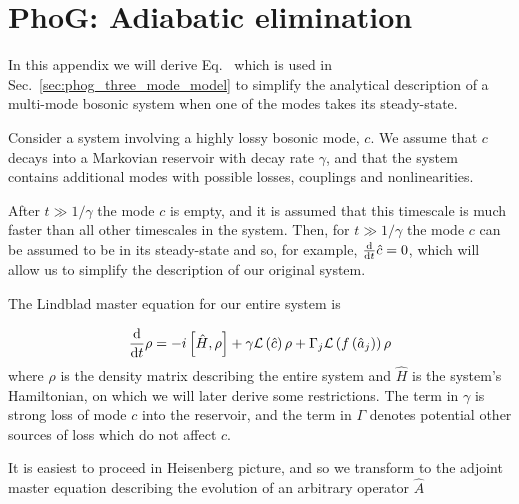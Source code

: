 %
%
%


\chapter{PhoG: Adiabatic elimination}\label{appendix:adiabatic_elimination}

In this appendix we will derive Eq.~ which is used in Sec.~\ref{sec:phog_three_mode_model} to simplify the analytical description of a multi-mode bosonic system when one of the modes takes its steady-state. 

Consider a system involving a highly lossy bosonic mode, $c$. We assume that $c$ decays into a Markovian reservoir with decay rate $\gamma$, and that the system contains additional modes with possible losses, couplings and nonlinearities. 

After $t \gg 1/\gamma$ the mode $c$ is empty, and it is assumed that this timescale is much faster than all other timescales in the system. Then, for $t \gg 1/\gamma$ the mode $c$ can be assumed to be in its steady-state and so, for example, $\frac{\mathrm{d}}{\mathrm{d}t} \hat{c} = 0$, which will allow us to simplify the description of our original system.

The Lindblad master equation for our entire system is

\begin{equation}
\frac{\mathrm{d}}{\mathrm{d}t} \rho = - i \left[ \hat{H}, \rho \right] + \gamma \mathcal{L}\left(\hat{c}\right) \rho + \Gamma_j\mathcal{L}\left(f\left(\hat{a}_j\right)\right) \rho
\end{equation}
where $\rho$ is the density matrix describing the entire system and $\hat{H}$ is the system's Hamiltonian, on which we will later derive some restrictions. The term in $\gamma$ is strong loss of mode $c$ into the reservoir, and the term in $\Gamma$ denotes potential other sources of loss which do not affect $c$.

It is easiest to proceed in Heisenberg picture, and so we transform to the adjoint master equation \cite{Breuer2002} describing the evolution of an arbitrary operator $\hat{A}$

